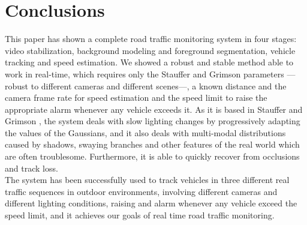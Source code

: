 \section{Conclusions}
\label{sec:conclusions}

This paper has shown a complete road traffic monitoring system in four stages: video stabilization, background modeling and foreground segmentation, vehicle tracking and speed estimation. We showed a robust and stable method able to work in real-time, which requires only the Stauffer and Grimson parameters ---robust to different cameras and different scenes---, a known distance and the camera frame rate for speed estimation and the speed limit to raise the appropriate alarm whenever any vehicle exceeds it. As it is based in Stauffer and Grimson \cite{stauffer1999adaptive}, the system deals with slow lighting changes by progressively adapting the values of the Gaussians, and it also deals with multi-modal distributions caused by shadows, swaying branches and other features of the real world which are often troublesome. Furthermore, it is able to quickly recover from occlusions and track loss.\\

\noindent The system has been successfully used to track vehicles in three different real traffic sequences in outdoor environments, involving different cameras and different lighting conditions, raising and alarm whenever any vehicle exceed the speed limit, and it achieves our goals of real time road traffic monitoring.